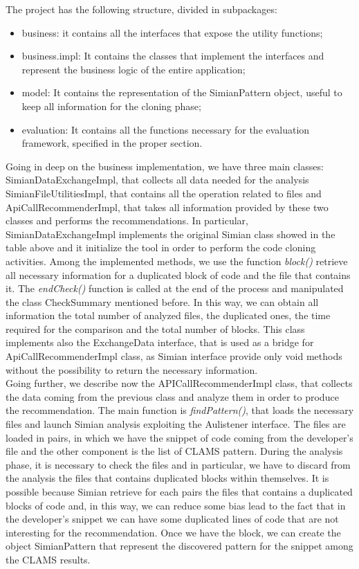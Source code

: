The project has the following structure, divided in subpackages:
\begin{itemize}
\item business: it contains all the interfaces that expose the utility functions;
\item business.impl: It contains the classes that implement the interfaces and represent the business logic of the entire application;
\item model: It contains the representation of the SimianPattern object, useful to keep all information for the cloning phase;
\item evaluation: It contains all the functions necessary for the evaluation framework, specified in the proper section.
\end{itemize}
Going in deep on the business implementation, we have three main classes: SimianDataExchangeImpl, that collects all data needed for the analysis SimianFileUtilitiesImpl, that contains all the operation related to files and ApiCallRecommenderImpl, that takes all information provided by these two classes and performs the recommendations. In particular, SimianDataExchangeImpl implements the original Simian class showed in the table above and it initialize the tool in order to perform the code cloning activities. Among the implemented methods, we use the function \textit{block()} retrieve all necessary information for a duplicated block of code and the file that contains it. The \textit{endCheck()} function is called at the end of the process and manipulated the class CheckSummary mentioned before. In this way, we can obtain all information the total number of analyzed files, the duplicated ones, the time required for the comparison and the total number of blocks. This class implements also the ExchangeData interface, that is used as a bridge for ApiCallRecommenderImpl class, as Simian interface provide only void methods without the possibility to return the necessary information.\\
Going further, we describe now the APICallRecommenderImpl class, that collects the data coming from the previous class and analyze them in order to produce the recommendation. The main function is \textit{findPattern()}, that loads the necessary files and launch Simian analysis exploiting the Aulistener interface. The files are loaded in pairs, in which we have the snippet of code coming from the developer's file and the other component is the list of CLAMS pattern. During the analysis phase, it is necessary to check the files and in particular, we have to discard from the analysis the files that contains duplicated blocks within themselves. It is possible because Simian retrieve for each pairs the files that contains a duplicated blocks of code and, in this way, we can reduce some bias lead to the fact that in the developer's snippet we can have some duplicated lines of code that are not interesting for the recommendation. Once we have the block, we can create the object SimianPattern that represent the discovered pattern for the snippet among the CLAMS results.\\

